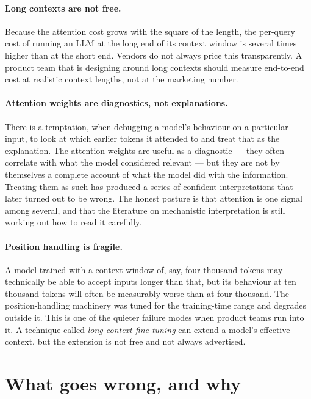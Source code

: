 \paragraph{Long contexts are not free.} Because the attention
cost grows with the square of the length, the per-query cost of
running an LLM at the long end of its context window is
several times higher than at the short end. Vendors do not
always price this transparently. A product team that is
designing around long contexts should measure end-to-end cost
at realistic context lengths, not at the marketing number.

\paragraph{Attention weights are diagnostics, not explanations.}
There is a temptation, when debugging a model's behaviour on a
particular input, to look at which earlier tokens it attended
to and treat that as the explanation. The attention weights are
useful as a diagnostic --- they often correlate with what the
model considered relevant --- but they are not by themselves a
complete account of what the model did with the information.
Treating them as such has produced a series of confident
interpretations that later turned out to be wrong. The honest
posture is that attention is one signal among several, and that
the literature on mechanistic interpretation is still working
out how to read it carefully.

\paragraph{Position handling is fragile.} A model trained with
a context window of, say, four thousand tokens may technically
be able to accept inputs longer than that, but its behaviour at
ten thousand tokens will often be measurably worse than at four
thousand. The position-handling machinery was tuned for the
training-time range and degrades outside it. This is one of the
quieter failure modes when product teams run into it. A
technique called \emph{long-context fine-tuning} can extend a
model's effective context, but the extension is not free and
not always advertised.

\section{What goes wrong, and why}

